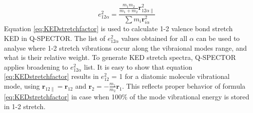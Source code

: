 \documentclass[10pt]{article}
\begin{document}
\begin{equation}
\label{eq:KEDstretchfactor}
e^2_{12\alpha} = \frac{\frac{m_1 m_2}{m_1 + m_2}\boldsymbol{r}_{12\alpha\parallel}^2}{\sum m_i\boldsymbol{r}^2_{i\alpha}} 
\end{equation}   
Equation \ref{eq:KEDstretchfactor} is used to calculate 1-2 valence bond stretch KED in \textsf{Q-SPECTOR}. The list of 
$e^2_{12\alpha}$ values obtained for all $\alpha$ can be used to analyse where 1-2 stretch vibrations occur along the vibraional 
modes range, and what is their relative weight. To generate KED stretch spectra, \textsf{Q-SPECTOR} applies broadening to $e^2_{12\alpha}$ list.
It is easy to show that equation \ref{eq:KEDstretchfactor} results in $e^2_{12}$ = 1 for a diatomic molecule vibrational mode, 
using $\boldsymbol{r}_{12\parallel} =\boldsymbol{r}_{12}$ and $\boldsymbol{r}_2 = -\frac{m_1}{m_2} \boldsymbol{r}_1$. 
This reflects proper behavior of formula \ref{eq:KEDstretchfactor} in case when 100$\%$ of the mode vibrational energy is stored in 1-2 stretch. 

\vskip 5pt
\end{document}
